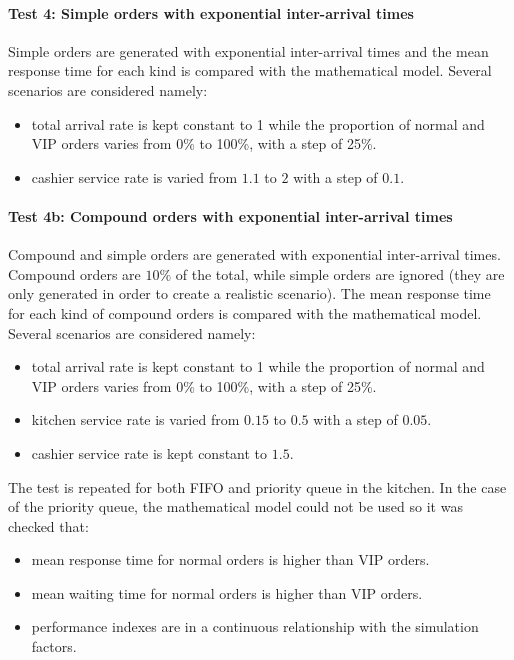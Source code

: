 \paragraph{Test 4: Simple orders with exponential inter-arrival times}
Simple orders are generated with exponential inter-arrival times and the 
mean response time for each kind is compared with the mathematical model. Several 
scenarios are considered namely:
\begin{itemize}
    \item total arrival rate is kept constant to 1 while the proportion of 
        normal and VIP orders varies from 0\% to 100\%, with a step of 25\%.
    \item cashier service rate is varied from $1.1$ to $2$ with a step of $0.1$.
\end{itemize}

\paragraph{Test 4b: Compound orders with exponential inter-arrival times}
Compound and simple orders are generated with exponential inter-arrival times.
Compound orders are $10\%$ of the total, while simple orders are ignored (they are
only generated in order to create a realistic scenario). The 
mean response time for each kind of compound orders is compared with the mathematical 
model. Several scenarios are considered namely:
\begin{itemize}
    \item total arrival rate is kept constant to 1 while the proportion of 
        normal and VIP orders varies from 0\% to 100\%, with a step of 25\%.
    \item kitchen service rate is varied from $0.15$ to $0.5$ with a step of $0.05$.
    \item cashier service rate is kept constant to $1.5$.
\end{itemize}
The test is repeated for both FIFO and priority queue in the kitchen. In the case 
of the priority queue, the mathematical model could not be used so it was checked 
that:
\begin{itemize}
    \item mean response time for normal orders is higher than VIP orders.
    \item mean waiting time for normal orders is higher than VIP orders.
    \item performance indexes are in a continuous relationship with the simulation
        factors.
\end{itemize}

